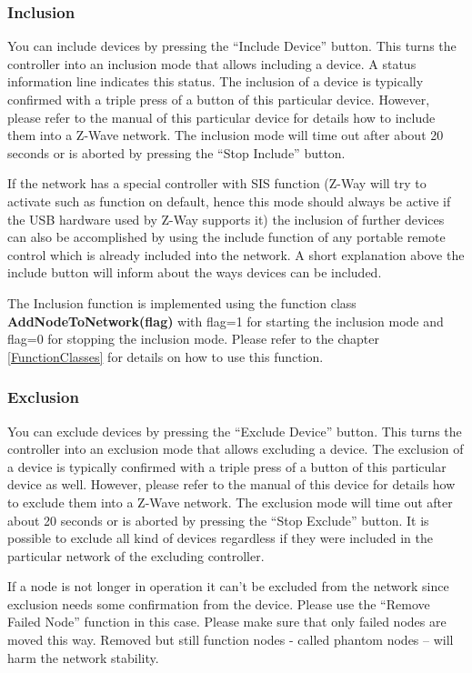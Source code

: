 \subsubsection{Inclusion}

 
You can include devices by pressing the “Include Device” button. This turns the controller into an inclusion mode that allows including a device.  A status information 
line indicates this status. The inclusion of a device is typically confirmed with a triple press of a button of this particular device. However, please refer to the manual of 
this particular device for details how to include them into a Z-Wave network. The inclusion mode will time out after about 20 seconds or is aborted by pressing the 
“Stop Include” button.

If the network has a special controller with SIS function (Z-Way will try to activate such as function on default, hence this mode should always be active if the USB 
hardware used by Z-Way supports it) the inclusion of further devices can also be accomplished by using the include function of any portable remote control which 
is already included into the network.   A short explanation above the include button will inform about the ways devices can be included.

The Inclusion function is implemented using the function class {\bf AddNodeToNetwork(flag)} with flag=1 for starting the inclusion mode and flag=0 for stopping the 
inclusion mode. Please refer to the chapter \ref{FunctionClasses} for details on how to use this function.


\subsubsection{Exclusion}

You can exclude devices by pressing the “Exclude Device” button. This turns the controller into an exclusion mode that allows excluding a device. 
The exclusion of a device is typically confirmed with a triple press of a button of this particular device as well. However, please refer to the manual 
of this device for details how to exclude them into a Z-Wave network. The exclusion mode will time out after about 20 seconds or is aborted by pressing the 
“Stop Exclude” button.
It is possible to exclude all kind of devices regardless if they were included in the particular network of the excluding controller.

If a node is not longer in operation it can’t be excluded from the network since exclusion needs some confirmation from the device. Please use the “Remove Failed Node” function in this case. 
Please make sure that only failed nodes are moved this way. Removed but still function nodes  - called phantom nodes – will harm the network stability.


